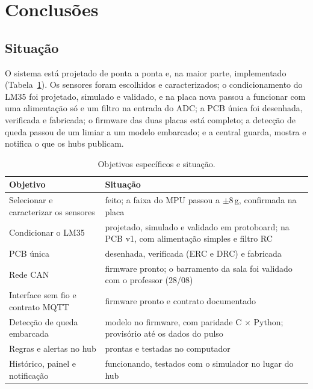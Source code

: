 \section{Conclusões}\label{sec:conclusoes}
\subsection{Situação}

O sistema está projetado de ponta a ponta e, na maior parte, implementado
(Tabela~\ref{tab:objetivos}). Os sensores foram escolhidos e caracterizados; o condicionamento
do LM35 foi projetado, simulado e validado, e na placa nova passou a funcionar com uma
alimentação só e um filtro na entrada do ADC; a PCB única foi desenhada, verificada e
fabricada; o firmware das duas placas está completo; a detecção de queda
passou de um limiar a um modelo embarcado; e a central guarda, mostra e notifica o que os hubs
publicam.

\begin{table}[H]
\centering
\caption{Objetivos específicos e situação.}
\label{tab:objetivos}
\small
\begin{tabular}{@{}>{\raggedright\arraybackslash}p{6.4cm}>{\raggedright\arraybackslash}p{7.4cm}@{}}
\toprule
Objetivo & Situação \\
\midrule
Selecionar e caracterizar os sensores & feito; a faixa do MPU passou a $\pm$8\,g, confirmada na placa \\
Condicionar o LM35 & projetado, simulado e validado em protoboard; na PCB v1, com alimentação simples e filtro RC \\
PCB única & desenhada, verificada (ERC e DRC) e fabricada \\
Rede CAN & firmware pronto; o barramento da sala foi validado com o professor (28/08) \\
Interface sem fio e contrato MQTT & firmware pronto e contrato documentado \\
Detecção de queda embarcada & modelo no firmware, com paridade C $\times$ Python; provisório até os dados do pulso \\
Regras e alertas no hub & prontas e testadas no computador \\
Histórico, painel e notificação & funcionando, testados com o simulador no lugar do hub \\
\bottomrule
\end{tabular}
\end{table}

